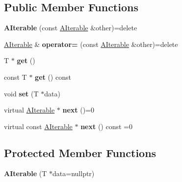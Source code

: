 \subsection*{Public Member Functions}
\begin{DoxyCompactItemize}
\item 
\mbox{\label{classathome_1_1utility_1_1_a_iterable_af9f6341868478344f8c870c531d0d501}} 
{\bfseries A\+Iterable} (const \mbox{\hyperlink{classathome_1_1utility_1_1_a_iterable}{A\+Iterable}} \&other)=delete
\item 
\mbox{\label{classathome_1_1utility_1_1_a_iterable_acd196ece46b7d400e486b1f113be58b6}} 
\mbox{\hyperlink{classathome_1_1utility_1_1_a_iterable}{A\+Iterable}} \& {\bfseries operator=} (const \mbox{\hyperlink{classathome_1_1utility_1_1_a_iterable}{A\+Iterable}} \&other)=delete
\item 
\mbox{\label{classathome_1_1utility_1_1_a_iterable_ae390308d9b2a56a4a5d437dbb17acdd0}} 
T $\ast$ {\bfseries get} ()
\item 
\mbox{\label{classathome_1_1utility_1_1_a_iterable_aaf67eeba96f5756ab5ee08cf6c67b31b}} 
const T $\ast$ {\bfseries get} () const
\item 
\mbox{\label{classathome_1_1utility_1_1_a_iterable_a1efac464c81cd5d2dc67ec3ea91615d2}} 
void {\bfseries set} (T $\ast$data)
\item 
\mbox{\label{classathome_1_1utility_1_1_a_iterable_af8cb115065b64fb02e3cf4171cec2d59}} 
virtual \mbox{\hyperlink{classathome_1_1utility_1_1_a_iterable}{A\+Iterable}} $\ast$ {\bfseries next} ()=0
\item 
\mbox{\label{classathome_1_1utility_1_1_a_iterable_a641503294c7fbebd3d1a30966455a789}} 
virtual const \mbox{\hyperlink{classathome_1_1utility_1_1_a_iterable}{A\+Iterable}} $\ast$ {\bfseries next} () const =0
\end{DoxyCompactItemize}
\subsection*{Protected Member Functions}
\begin{DoxyCompactItemize}
\item 
\mbox{\label{classathome_1_1utility_1_1_a_iterable_a19c2d12125723a3efadae7f66bf30db7}} 
{\bfseries A\+Iterable} (T $\ast$data=nullptr)
\end{DoxyCompactItemize}


